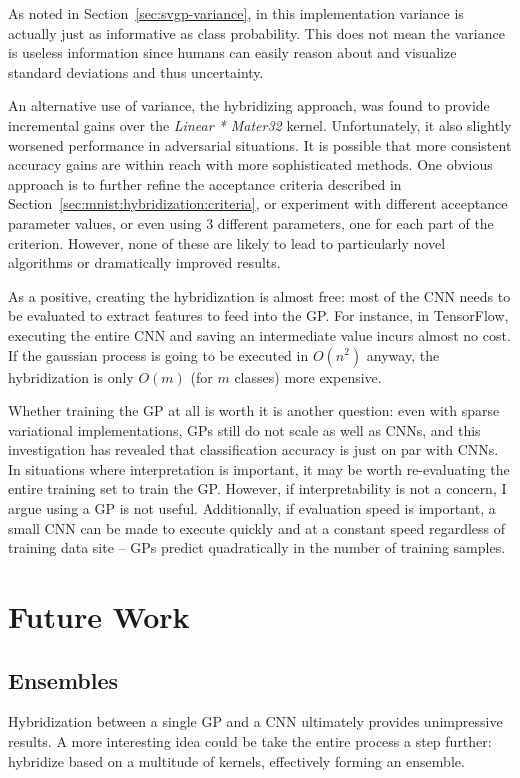 \documentclass{article}
\begin{document}
As noted in Section~\ref{sec:svgp-variance}, in this implementation variance is actually just as informative as class probability. This does not mean the variance is useless information since humans can easily reason about and visualize standard deviations and thus uncertainty.

An alternative use of variance, the hybridizing approach, was found to provide incremental gains over the \textit{Linear * Mater32} kernel. Unfortunately, it also slightly worsened performance in adversarial situations. It is possible that more consistent accuracy gains are within reach with more sophisticated methods. One obvious approach is to further refine the acceptance criteria described in Section~\ref{sec:mnist:hybridization:criteria}, or experiment with different acceptance parameter values, or even using 3 different parameters, one for each part of the criterion. However, none of these are likely to lead to particularly novel algorithms or dramatically improved results.

As a positive, creating the hybridization is almost free: most of the CNN needs to be evaluated to extract features to feed into the GP. For instance, in TensorFlow, executing the entire CNN and saving an intermediate value incurs almost no cost. If the gaussian process is going to be executed in $O(n^2)$ anyway, the hybridization is only $O(m)$ (for $m$ classes) more expensive.

Whether training the GP at all is worth it is another question: even with sparse variational implementations, GPs still do not scale as well as CNNs, and this investigation has revealed that classification accuracy is just on par with CNNs. In situations where interpretation is important, it may be worth re-evaluating the entire training set to train the GP. However, if interpretability is not a concern, I argue using a GP is not useful. Additionally, if evaluation speed is important, a small CNN can be made to execute quickly and at a constant speed regardless of training data site -- GPs predict quadratically in the number of training samples.

\section{Future Work}

\subsection{Ensembles}
Hybridization between a single GP and a CNN ultimately provides unimpressive results. A more interesting idea could be take the entire process a step further: hybridize based on a multitude of kernels, effectively forming an ensemble. 
\end{document}
